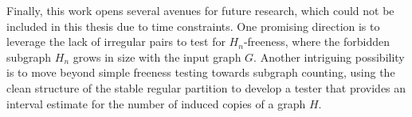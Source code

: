     Finally, this work opens several avenues for future research, which could not be included in this thesis due to time
    constraints.
    One promising direction is to leverage the lack of irregular pairs to test for $H_n$-freeness, where the forbidden
    subgraph $H_n$ grows in size with the input graph $G$.
    Another intriguing possibility is to move beyond simple freeness testing towards subgraph counting, using the clean
    structure of the stable regular partition to develop a tester that provides an interval estimate for the number of
    induced copies of a graph $H$.